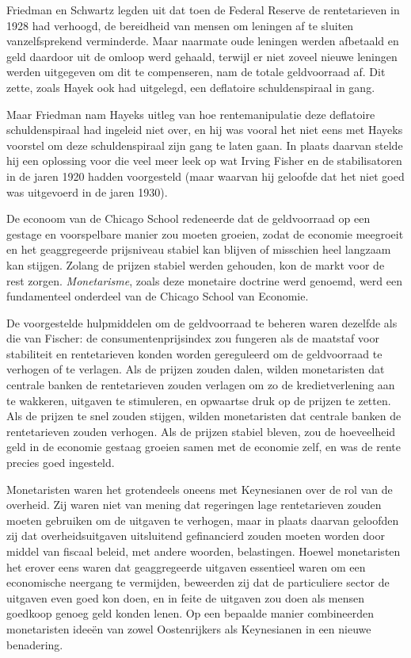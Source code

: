 \documentclass[
  a5paper,
  smalldemyvopaper,11pt,twoside,onecolumn,openright,extrafontsizes,
hidelinks]{memoir}
\begin{document}
Friedman en Schwartz legden uit dat toen de Federal Reserve de
rentetarieven in 1928 had verhoogd, de bereidheid van mensen om leningen
af te sluiten vanzelfsprekend verminderde. Maar naarmate oude leningen
werden afbetaald en geld daardoor uit de omloop werd gehaald, terwijl er
niet zoveel nieuwe leningen werden uitgegeven om dit te compenseren, nam
de totale geldvoorraad af. Dit zette, zoals Hayek ook had uitgelegd, een
deflatoire schuldenspiraal in gang.

Maar Friedman nam Hayeks uitleg van hoe rentemanipulatie deze deflatoire
schuldenspiraal had ingeleid niet over, en hij was vooral het niet eens
met Hayeks voorstel om deze schuldenspiraal zijn gang te laten gaan. In
plaats daarvan stelde hij een oplossing voor die veel meer leek op wat
Irving Fisher en de stabilisatoren in de jaren 1920 hadden voorgesteld
(maar waarvan hij geloofde dat het niet goed was uitgevoerd in de jaren
1930).

De econoom van de Chicago School redeneerde dat de geldvoorraad op een
gestage en voorspelbare manier zou moeten groeien, zodat de economie
meegroeit en het geaggregeerde prijsniveau stabiel kan blijven of
misschien heel langzaam kan stijgen. Zolang de prijzen stabiel werden
gehouden, kon de markt voor de rest zorgen. \emph{Monetarisme}, zoals
deze monetaire doctrine werd genoemd, werd een fundamenteel onderdeel
van de Chicago School van Economie.

De voorgestelde hulpmiddelen om de geldvoorraad te beheren waren
dezelfde als die van Fischer: de consumentenprijsindex zou fungeren als
de maatstaf voor stabiliteit en rentetarieven konden worden gereguleerd
om de geldvoorraad te verhogen of te verlagen. Als de prijzen zouden
dalen, wilden monetaristen dat centrale banken de rentetarieven zouden
verlagen om zo de kredietverlening aan te wakkeren, uitgaven te
stimuleren, en opwaartse druk op de prijzen te zetten. Als de prijzen te
snel zouden stijgen, wilden monetaristen dat centrale banken de
rentetarieven zouden verhogen. Als de prijzen stabiel bleven, zou de
hoeveelheid geld in de economie gestaag groeien samen met de economie
zelf, en was de rente precies goed ingesteld.

Monetaristen waren het grotendeels oneens met Keynesianen over de rol
van de overheid. Zij waren niet van mening dat regeringen lage
rentetarieven zouden moeten gebruiken om de uitgaven te verhogen, maar
in plaats daarvan geloofden zij dat overheidsuitgaven uitsluitend
gefinancierd zouden moeten worden door middel van fiscaal beleid, met
andere woorden, belastingen. Hoewel monetaristen het erover eens waren
dat geaggregeerde uitgaven essentieel waren om een economische neergang
te vermijden, beweerden zij dat de particuliere sector de uitgaven even
goed kon doen, en in feite de uitgaven zou doen als mensen goedkoop
genoeg geld konden lenen. Op een bepaalde manier combineerden
monetaristen ideeën van zowel Oostenrijkers als Keynesianen in een
nieuwe benadering.
\end{document}

